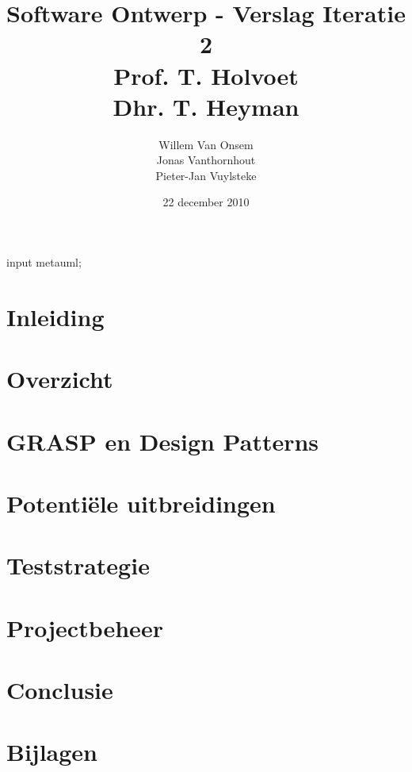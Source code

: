 \documentclass[a4paper,titlepage]{article}
\title{Software Ontwerp - Verslag Iteratie 2\\Prof. T. Holvoet\\Dhr. T. Heyman}
\author{Willem Van Onsem\\Jonas Vanthornhout\\Pieter-Jan Vuylsteke}
\date{22 december 2010}
\begin{document}
\begin{empfile}
\begin{empcmds}
input metauml;
\end{empcmds}
\begin{titlepage}
\maketitle
\end{titlepage}
\tableofcontents
\newpage
\section*{Inleiding}

\newpage
\section{Overzicht}

\newpage
\section{GRASP en Design Patterns}

\newpage
\section{Potenti\"ele uitbreidingen}

\newpage
\section{Teststrategie}

\newpage
\section{Projectbeheer}

\newpage
\section{Conclusie}

\newpage
\appendix
\section{Bijlagen}



\end{empfile}
\end{document}
